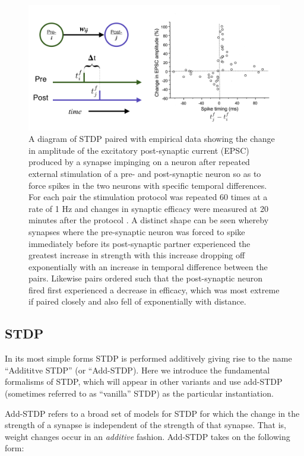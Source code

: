 \begin{figure} [h]
\centering
\includegraphics[width=\textwidth]{./images/STDP_intro_fig.png}
\caption[From Bi and Poo, 1998 \cite{bi1998synaptic}]{A diagram of STDP paired with empirical data showing the change in amplitude of the excitatory post-synaptic current (EPSC) produced by a synapse impinging on a neuron after repeated external stimulation of a pre- and post-synaptic neuron so as to force spikes in the two neurons with specific temporal differences. For each pair the stimulation protocol was repeated 60 times at a rate of 1 Hz and changes in synaptic efficacy were measured at 20 minutes after the protocol  \cite{bi1998synaptic}. A distinct shape can be seen whereby synapses where the pre-synaptic neuron was forced to spike immediately before its post-synaptic partner  experienced the greatest increase in strength with this increase dropping off exponentially with an increase in temporal difference between the pairs. Likewise pairs ordered such that the post-synaptic neuron fired first experienced a decrease in efficacy, which was most extreme if paired closely and also fell of exponentially with distance.}
\label{STDP_intro}
\end{figure}
\subsection{STDP}

In its most simple forms STDP is performed additively giving rise to the name ``Addititve STDP'' (or ``Add-STDP). Here we introduce the fundamental formalisms of STDP, which will appear in other variants and use add-STDP (sometimes referred to as ``vanilla'' STDP) as the particular instantiation.

Add-STDP refers to a broad set of models for STDP for which the change in the strength of a synapse is independent of the strength of that synapse. That is, weight changes occur in an \emph{additive} fashion. Add-STDP takes on the following form:

